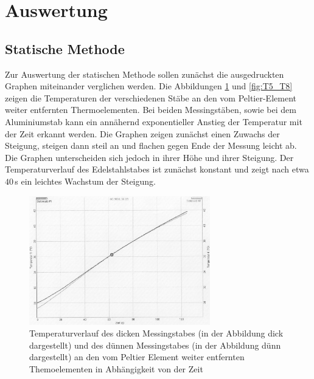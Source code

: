 \section{Auswertung}
\label{sec:Auswertung}

\subsection{Statische Methode}
\label{sec:auswertung_statisch}

Zur Auswertung der statischen Methode sollen zunächst die ausgedruckten Graphen
miteinander verglichen werden. Die Abbildungen \ref{fig:T1_T4} und \ref{fig:T5_T8} zeigen
die Temperaturen der verschiedenen Stäbe an den vom Peltier-Element weiter entfernten
Thermoelementen. Bei beiden Messingstäben, sowie bei dem Aluminiumstab kann ein annähernd
exponentieller Anstieg der Temperatur mit der Zeit erkannt werden. Die Graphen
zeigen zunächst einen Zuwachs der Steigung, steigen dann  steil an und flachen
gegen Ende der Messung leicht ab. Die Graphen unterscheiden sich jedoch in ihrer
Höhe und ihrer Steigung. Der Temperaturverlauf des Edelstahlstabes ist zunächst
konstant und zeigt nach etwa $40$\,s ein leichtes Wachstum der Steigung.

\begin{figure}
  \centering
  \includegraphics[width=0.7\textwidth]{data/t1undt4.JPEG}
  \caption{Temperaturverlauf des dicken Messingstabes (in der Abbildung dick dargestellt)
  und des dünnen Messingstabes (in der Abbildung dünn dargestellt) an den vom Peltier
  Element weiter entfernten Themoelementen in Abhängigkeit von der Zeit}
  \label{fig:T1_T4}
\end{figure}

